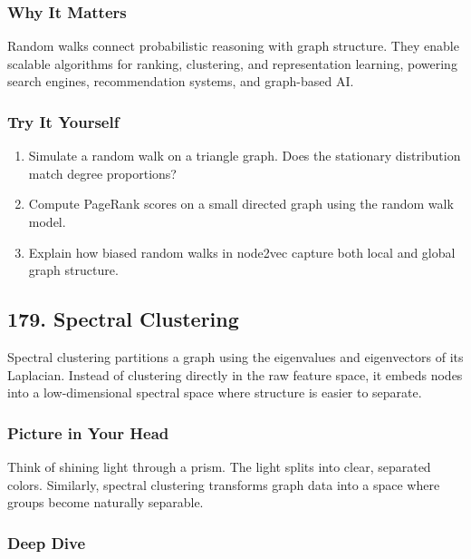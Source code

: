 \documentclass[
  letterpaper,
  DIV=11,
  numbers=noendperiod]{scrreprt}
\providecommand{\tightlist}{%
  \setlength{\itemsep}{0pt}\setlength{\parskip}{0pt}}
\begin{document}
\subsubsection{Why It Matters}\label{why-it-matters-75}

Random walks connect probabilistic reasoning with graph structure. They
enable scalable algorithms for ranking, clustering, and representation
learning, powering search engines, recommendation systems, and
graph-based AI.

\subsubsection{Try It Yourself}\label{try-it-yourself-177}

\begin{enumerate}
\def\labelenumi{\arabic{enumi}.}
\tightlist
\item
  Simulate a random walk on a triangle graph. Does the stationary
  distribution match degree proportions?
\item
  Compute PageRank scores on a small directed graph using the random
  walk model.
\item
  Explain how biased random walks in node2vec capture both local and
  global graph structure.
\end{enumerate}

\subsection{179. Spectral Clustering}\label{spectral-clustering}

Spectral clustering partitions a graph using the eigenvalues and
eigenvectors of its Laplacian. Instead of clustering directly in the raw
feature space, it embeds nodes into a low-dimensional spectral space
where structure is easier to separate.

\subsubsection{Picture in Your Head}\label{picture-in-your-head-178}

Think of shining light through a prism. The light splits into clear,
separated colors. Similarly, spectral clustering transforms graph data
into a space where groups become naturally separable.

\subsubsection{Deep Dive}\label{deep-dive-178}
\end{document}
